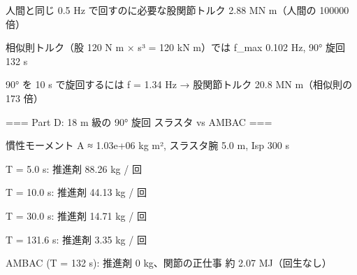 {  人間と同じ 0.5 Hz で回すのに必要な股関節トルク 2.88 MN m（人間の 100000 倍）\par
  相似則トルク（股 120 N m × s³ = 120 kN m）では f\_max 0.102 Hz, 90° 旋回 132 s\par
  90° を 10 s で旋回するには f = 1.34 Hz → 股関節トルク 20.8 MN m（相似則の 173 倍）\par
\mbox{}\par
=== Part D: 18 m 級の 90° 旋回 スラスタ vs AMBAC ===\par
慣性モーメント A ≈ 1.03e+06 kg m², スラスタ腕 5.0 m, Isp 300 s\par
  T =    5.0 s: 推進剤   88.26 kg / 回\par
  T =   10.0 s: 推進剤   44.13 kg / 回\par
  T =   30.0 s: 推進剤   14.71 kg / 回\par
  T =  131.6 s: 推進剤    3.35 kg / 回\par
  AMBAC (T = 132 s): 推進剤 0 kg、関節の正仕事 約 2.07 MJ（回生なし）\par
}

